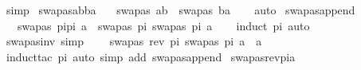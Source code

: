 \begin{isabellebody}
\ simp%
\endisatagproof
{\isafoldproof}%
%
\isadelimproof
\isanewline
%
\endisadelimproof
\isanewline
{}\isamarkupfalse%
\ swapas{\isacharunderscore}{\kern0pt}ab{\isacharunderscore}{\kern0pt}ba{\isacharcolon}{\kern0pt}\isanewline
\ \ \ {\isachardoublequoteopen}swapas\ {\isacharbrackleft}{\kern0pt}{\isacharparenleft}{\kern0pt}a{\isacharcomma}{\kern0pt}b{\isacharparenright}{\kern0pt}{\isacharbrackright}{\kern0pt}\ {\isacharequal}{\kern0pt}\ swapas\ {\isacharbrackleft}{\kern0pt}{\isacharparenleft}{\kern0pt}b{\isacharcomma}{\kern0pt}a{\isacharparenright}{\kern0pt}{\isacharbrackright}{\kern0pt}{\isachardoublequoteclose}\isanewline
%
\isadelimproof
\ \ %
\endisadelimproof
%
\isatagproof
{}\isamarkupfalse%
\ auto%
\endisatagproof
{\isafoldproof}%
%
\isadelimproof
\isanewline
%
\endisadelimproof
\isanewline
{}\isamarkupfalse%
\ swapas{\isacharunderscore}{\kern0pt}append{\isacharcolon}{\kern0pt}\ \isanewline
\ \ \ {\isachardoublequoteopen}swapas\ {\isacharparenleft}{\kern0pt}pi{}{\isacharat}{\kern0pt}pi{}{\isacharparenright}{\kern0pt}\ a\ {\isacharequal}{\kern0pt}\ swapas\ pi{}\ {\isacharparenleft}{\kern0pt}swapas\ pi{}\ a{\isacharparenright}{\kern0pt}{\isachardoublequoteclose}\isanewline
%
\isadelimproof
\ \ %
\endisadelimproof
%
\isatagproof
{}\isamarkupfalse%
\ {\isacharparenleft}{\kern0pt}induct\ pi{}{\isacharparenright}{\kern0pt}\ auto%
\endisatagproof
{\isafoldproof}%
%
\isadelimproof
\isanewline
%
\endisadelimproof
\ \isanewline
{}\isamarkupfalse%
\ swapas{\isacharunderscore}{\kern0pt}inv\ {\isacharbrackleft}{\kern0pt}simp{\isacharbrackright}{\kern0pt}{\isacharcolon}{\kern0pt}\ \isanewline
\ \ \ {\isachardoublequoteopen}swapas\ {\isacharparenleft}{\kern0pt}rev\ pi{\isacharparenright}{\kern0pt}\ {\isacharparenleft}{\kern0pt}swapas\ pi\ a{\isacharparenright}{\kern0pt}\ {\isacharequal}{\kern0pt}\ a{\isachardoublequoteclose}\isanewline
%
\isadelimproof
\ \ %
\endisadelimproof
%
\isatagproof
{}\isamarkupfalse%
\ {\isacharparenleft}{\kern0pt}induct{\isacharunderscore}{\kern0pt}tac\ pi{\isacharparenright}{\kern0pt}\ {\isacharparenleft}{\kern0pt}auto\ simp\ add{\isacharcolon}{\kern0pt}\ swapas{\isacharunderscore}{\kern0pt}append{\isacharparenright}{\kern0pt}%
\endisatagproof
{\isafoldproof}%
%
\isadelimproof
\isanewline
%
\endisadelimproof
\isanewline
{}\isamarkupfalse%
\ swapas{\isacharunderscore}{\kern0pt}rev{\isacharunderscore}{\kern0pt}pi{\isacharunderscore}{\kern0pt}a{\isacharcolon}{\kern0pt}\ \isanewline

\end{isabellebody}
